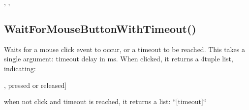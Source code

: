 \documentclass[letterpaper,10pt,english]{sphinxmanual}
\begin{document}
\sphinxAtStartPar
{}

\begin{sphinxVerbatim}[commandchars=\\\{\}]

\end{sphinxVerbatim}

\sphinxAtStartPar
{}

\sphinxAtStartPar
{},    , 

\ignorespaces 

\subsection{WaitForMouseButtonWithTimeout()}
\label{\detokenize{reference/peblenvironment:waitformousebuttonwithtimeout}}\label{\detokenize{reference/peblenvironment:index-82}}
\sphinxAtStartPar
{}

\sphinxAtStartPar
Waits for a mouse click event to occur, or a   timeout to be reached.   This takes a single argument: timeout delay in ms. When clicked, it returns a   4\sphinxhyphen{}tuple list, indicating:

\begin{sphinxVerbatim}[commandchars=\\\{\}]
[xpos,  ypos,   button id [1\PYGZhy{}3],   \PYGZdq{}\PYGZlt{}pressed\PYGZgt{}\PYGZdq{} or \PYGZdq{}\PYGZlt{}released\PYGZgt{}\PYGZdq{}]

when not click and timeout is reached, it returns a list:    ``[timeout]``
\end{sphinxVerbatim}
\end{document}
